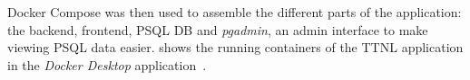 Docker Compose was then used to assemble the different parts of the application: the backend, frontend, \acl{PSQL} \ac{DB} and \emph{pgadmin}, an admin interface to make viewing \acl{PSQL} data easier.
 shows the running containers of the \ac{TTNL} application in the \emph{Docker Desktop} application~\cite{docker_inc_download_2021}.










